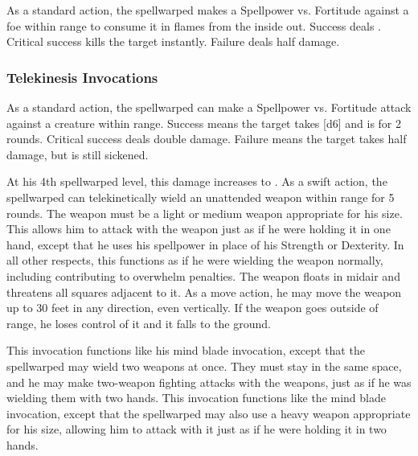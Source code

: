             As a standard action, the spellwarped makes a Spellpower vs. Fortitude against a foe within \rngclose range to consume it in flames from the inside out.
            Success deals .
            Critical success kills the target instantly.
            Failure deals half damage.

        \subsubsection{Telekinesis Invocations}
            As a standard action, the spellwarped can make a Spellpower vs. Fortitude attack against a creature within \rngclose range.
            Success means the target takes [d6] and is \sickened for 2 rounds.
            Critical success deals double damage.
            Failure means the target takes half damage, but is still sickened.
            \par At his 4th spellwarped level, this damage increases to .
            As a swift action, the spellwarped can telekinetically wield an unattended weapon within \rngclose range for 5 rounds.
            The weapon must be a light or medium weapon appropriate for his size.
            This allows him to attack with the weapon just as if he were holding it in one hand, except that he uses his spellpower in place of his Strength or Dexterity.
            In all other respects, this functions as if he were wielding the weapon normally, including contributing to overwhelm penalties.
            The weapon floats in midair and threatens all squares adjacent to it.
            As a move action, he may move the weapon up to 30 feet in any direction, even vertically.
            If the weapon goes outside of \rngclose range, he loses control of it and it falls to the ground.

            This invocation functions like his mind blade invocation, except that the spellwarped may wield two weapons at once.
            They must stay in the same space, and he may make two-weapon fighting attacks with the weapons, just as if he was wielding them with two hands.
            This invocation functions like the mind blade invocation, except that the spellwarped may also use a heavy weapon appropriate for his size, allowing him to attack with it just as if he were holding it in two hands.

